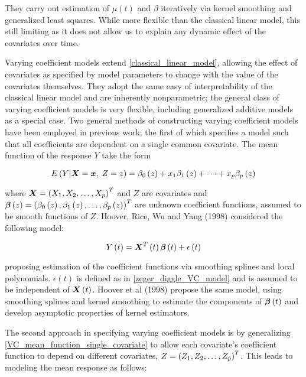 \documentclass[12pt]{article}
\newcommand{\bfbeta}{\mbox{\boldmath $\beta$}}
\newcommand{\bfx}{\mbox{\boldmath $x$}}
\newcommand{\bfX}{\mbox{\boldmath $X$}}
\begin{document}
They carry out estimation of $\mu\left(t\right)$ and $\beta$ iteratively via kernel smoothing and generalized least squares. While more flexible than the classical linear model, this still limiting as it does not allow us to explain any dynamic effect of the covariates over time.  

Varying coefficient models extend \eqref{classical_linear_model}, allowing the effect of covariates as specified by model parameters to change with the value of the covariates themselves.  They adopt the same easy of interpretability of the classical linear model and are inherently nonparametric; the general class of varying coefficient models is very flexible, including generalized additive models as a special case. Two general methods of constructing varying coefficient models have been employed in previous work; the first of which specifies a model such that all coefficients are dependent on a single common covariate. The mean function of the response $Y$ take the form

\begin{equation}
E\left(Y \vert \bfX=\bfx,\;Z = z \right) = \beta_0\left(z\right) + x_1\beta_1\left(z\right) + \dots  + x_p\beta_p\left(z\right) \label{VC_mean_function_single_smoothing_covariate}
\end{equation}

where $\bfX = \left(X_1, X_2, \dots, X_p\right)^T$ and $Z$ are covariates and $\bfbeta\left(z\right) = \left( \beta_0\left(z\right), \beta_1\left(z\right),\dots,\beta_p\left(z\right) \right)^T$ are unknown coefficient functions, assumed to be smooth functions of $Z$. Hoover, Rice, Wu and Yang (1998) considered the following model:

\begin{equation}
Y\left(t\right) =  \bfX^T\left(t\right)\bfbeta \left(t\right) + \epsilon\left(t\right) \label{hoover_rice_wu_VC_model}
\end{equation}

proposing estimation of the coefficient functions via smoothing splines and local polynomials. $\epsilon\left(t\right)$ is defined as in \eqref{zeger_diggle_VC_model} and is assumed to be independent of $\bfX\left(t\right)$. Hoover et al (1998) propose the same model, using smoothing splines and kernel smoothing to estimate  the components of $\bfbeta\left(t\right)$ and develop asymptotic properties of kernel estimators. 


The second approach in specifying varying coefficient models is by generalizing \eqref{VC_mean_function_single_covariate} to allow each covariate's coefficient function to depend on different covariates, $\boldmath{Z} = \left(Z_1, Z_2, \dots, Z_p\right)^T$. This leads to modeling the mean response as follows:
\end{document}
